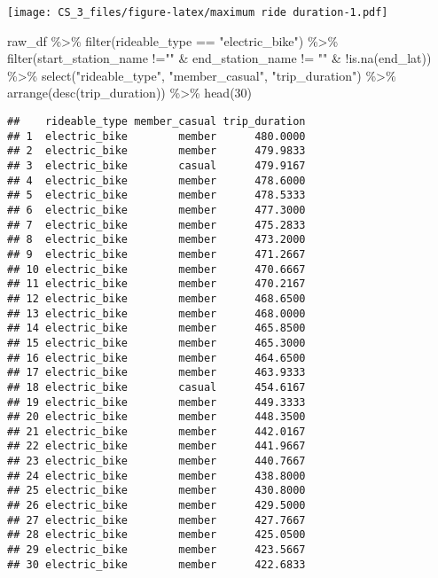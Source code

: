 \documentclass[
]{article}
\newenvironment{Shaded}{\begin{snugshade}}{\end{snugshade}}
\newcommand{\DecValTok}[1]{\textcolor[rgb]{0.00,0.00,0.81}{#1}}
\newcommand{\FunctionTok}[1]{\textcolor[rgb]{0.00,0.00,0.00}{#1}}
\newcommand{\NormalTok}[1]{#1}
\newcommand{\SpecialCharTok}[1]{\textcolor[rgb]{0.00,0.00,0.00}{#1}}
\newcommand{\StringTok}[1]{\textcolor[rgb]{0.31,0.60,0.02}{#1}}
\begin{document}
\texttt{[image: CS\_3\_files/figure-latex/maximum ride duration-1.pdf]}

\begin{Shaded}
\begin{Highlighting}[]
\NormalTok{raw\_df }\SpecialCharTok{\%\textgreater{}\%} 
  \FunctionTok{filter}\NormalTok{(rideable\_type }\SpecialCharTok{==} \StringTok{"electric\_bike"}\NormalTok{) }\SpecialCharTok{\%\textgreater{}\%}
  \FunctionTok{filter}\NormalTok{(start\_station\_name }\SpecialCharTok{!=}\StringTok{""} \SpecialCharTok{\&}\NormalTok{ end\_station\_name }\SpecialCharTok{!=} \StringTok{""} \SpecialCharTok{\&}
           \SpecialCharTok{!}\FunctionTok{is.na}\NormalTok{(end\_lat)) }\SpecialCharTok{\%\textgreater{}\%} 
  \FunctionTok{select}\NormalTok{(}\StringTok{"rideable\_type"}\NormalTok{, }\StringTok{"member\_casual"}\NormalTok{, }\StringTok{"trip\_duration"}\NormalTok{) }\SpecialCharTok{\%\textgreater{}\%} 
  \FunctionTok{arrange}\NormalTok{(}\FunctionTok{desc}\NormalTok{(trip\_duration)) }\SpecialCharTok{\%\textgreater{}\%} 
  \FunctionTok{head}\NormalTok{(}\DecValTok{30}\NormalTok{)}
\end{Highlighting}
\end{Shaded}

\begin{verbatim}
##    rideable_type member_casual trip_duration
## 1  electric_bike        member      480.0000
## 2  electric_bike        member      479.9833
## 3  electric_bike        casual      479.9167
## 4  electric_bike        member      478.6000
## 5  electric_bike        member      478.5333
## 6  electric_bike        member      477.3000
## 7  electric_bike        member      475.2833
## 8  electric_bike        member      473.2000
## 9  electric_bike        member      471.2667
## 10 electric_bike        member      470.6667
## 11 electric_bike        member      470.2167
## 12 electric_bike        member      468.6500
## 13 electric_bike        member      468.0000
## 14 electric_bike        member      465.8500
## 15 electric_bike        member      465.3000
## 16 electric_bike        member      464.6500
## 17 electric_bike        member      463.9333
## 18 electric_bike        casual      454.6167
## 19 electric_bike        member      449.3333
## 20 electric_bike        member      448.3500
## 21 electric_bike        member      442.0167
## 22 electric_bike        member      441.9667
## 23 electric_bike        member      440.7667
## 24 electric_bike        member      438.8000
## 25 electric_bike        member      430.8000
## 26 electric_bike        member      429.5000
## 27 electric_bike        member      427.7667
## 28 electric_bike        member      425.0500
## 29 electric_bike        member      423.5667
## 30 electric_bike        member      422.6833
\end{verbatim}
\end{document}
